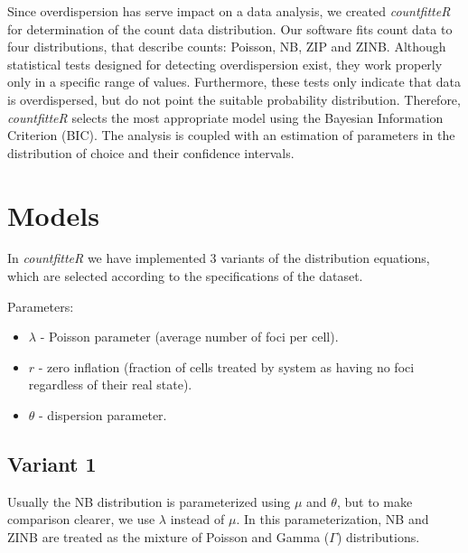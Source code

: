 Since overdispersion has serve impact on a data analysis, we created \emph{countfitteR} for determination of the count data distribution. Our software fits count data to four distributions, that describe counts: Poisson, NB, ZIP and ZINB. Although statistical tests designed for detecting overdispersion exist, they work properly only in a specific range of values. Furthermore, these tests only indicate that data is overdispersed, but do not point the suitable probability distribution. Therefore, \emph{countfitteR} selects the most appropriate model using the Bayesian Information Criterion (BIC). The analysis is coupled with an estimation of parameters in the distribution of choice and their confidence intervals.  

\section{Models}

In \emph{countfitteR} we have implemented 3 variants of the distribution equations, which are selected according to the specifications of the dataset. %

Parameters:
\begin{itemize}
\item $\lambda$ - Poisson parameter (average number of foci per cell). 
\item $r$ - zero inflation (fraction of cells treated by system as having no foci regardless of their real state).
\item $\theta$ - dispersion parameter.
\end{itemize}

\subsection{Variant 1}

Usually the NB distribution is parameterized using $\mu$ and $\theta$, but to make comparison clearer, we use $\lambda$ instead of $\mu$. In this parameterization, NB and ZINB are treated as the mixture of Poisson and Gamma ($\Gamma$) distributions.  

